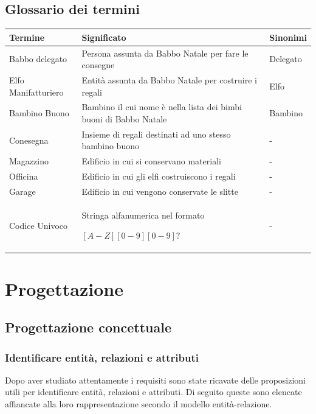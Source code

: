 \documentclass[12pt]{report}
\begin{document}
\section{Glossario dei termini}
\begin{tabular}{|p{}|p{}|p{}|}
\hline
\textbf{Termine} & \textbf{Significato} & \textbf{Sinonimi} \\
\hline
Babbo delegato & Persona assunta da Babbo Natale per fare le consegne & Delegato \\
\hline
Elfo Manifatturiero & Entità assunta da Babbo Natale per costruire i regali & Elfo \\
\hline
Bambino Buono & Bambino il cui nome è nella lista dei bimbi buoni di Babbo Natale & Bambino \\
\hline
Conesegna & Insieme di regali destinati ad uno stesso bambino buono & - \\
\hline
Magazzino & Edificio in cui si conservano materiali & - \\
\hline
Officina & Edificio in cui gli elfi costruiscono i regali & - \\
\hline
Garage & Edificio in cui vengono conservate le slitte & - \\
\hline
Codice Univoco & Stringa alfanumerica nel formato

$[A-Z][0-9][0-9]?$ & - \\
\hline
\end{tabular}

\chapter{Progettazione}
\section{Progettazione concettuale}
\subsection{Identificare entità, relazioni e attributi}
Dopo aver studiato attentamente i requisiti sono state ricavate delle 
proposizioni utili per identificare entità, relazioni e attributi. Di seguito
queste sono elencate affiancate alla loro rappresentazione secondo il modello
entità-relazione.
\end{document}
